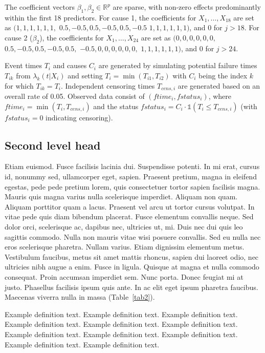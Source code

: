\documentclass[AMA,Times1COL]{WileyNJDv5} %
\begin{document}
The coefficient vectors $\beta_1, \beta_2 \in \mathbb{R}^p$ are sparse, with non-zero effects predominantly within the first 18 predictors. For cause 1, the coefficients for $X_1, \dots, X_{18}$ are set as $(1, 1, 1, 1, 1, 1,$ $0.5, -0.5, 0.5, -0.5, 0.5, -0.5$ $1, 1, 1, 1, 1, 1)$, and 0 for $j > 18$. For cause 2 ($\beta_2$), the coefficients for $X_1, \dots, X_{24}$ are set as $(0, 0, 0, 0, 0, 0,$ $0.5, -0.5, 0.5, -0.5, 0.5,$ $-0.5, 0, 0, 0, 0, 0, 0,$ $1, 1, 1, 1, 1, 1)$, and 0 for $j > 24$.

Event times $T_i$ and causes $C_i$ are generated by simulating potential failure times $T_{ik}$ from $\lambda_k(t|X_i)$ and setting $T_i = \min(T_{i1}, T_{i2})$ with $C_i$ being the index $k$ for which $T_{ik} = T_i$. Independent censoring times $T_{cens, i}$ are generated based on an overall rate of 0.05. Observed data consist of $(ftime_i, fstatus_i)$, where $ftime_i = \min(T_i, T_{cens, i})$ and the status $fstatus_i = C_i \cdot \mathds{1}(T_i \le T_{cens, i})$ (with $fstatus_i=0$ indicating censoring).


\subsection{Second level head}

Etiam euismod. Fusce facilisis lacinia dui. Suspendisse potenti. In mi erat, cursus id, nonummy sed, ullamcorper
eget, sapien. Praesent pretium, magna in eleifend egestas, pede pede pretium lorem, quis consectetuer tortor sapien
facilisis magna. Mauris quis magna varius nulla scelerisque imperdiet. Aliquam non quam. Aliquam porttitor quam
a lacus. Praesent vel arcu ut tortor cursus volutpat. In vitae pede quis diam bibendum placerat. Fusce elementum
convallis neque. Sed dolor orci, scelerisque ac, dapibus nec, ultricies ut, mi. Duis nec dui quis leo sagittis commodo.
Nulla non mauris vitae wisi posuere convallis. Sed eu nulla nec eros scelerisque pharetra. Nullam varius. Etiam
dignissim elementum metus. Vestibulum faucibus, metus sit amet mattis rhoncus, sapien dui laoreet odio, nec ultricies
nibh augue a enim. Fusce in ligula. Quisque at magna et nulla commodo consequat. Proin accumsan imperdiet sem.
Nunc porta. Donec feugiat mi at justo. Phasellus facilisis ipsum quis ante. In ac elit eget ipsum pharetra faucibus.
Maecenas viverra nulla in massa (Table~\ref{tab2}).

\begin{definition}
Example definition text. Example definition text. Example definition text. Example definition text. Example definition text. Example definition text. Example definition text. Example definition text. Example definition text. Example definition text. Example definition text.
\end{definition}
\end{document}
